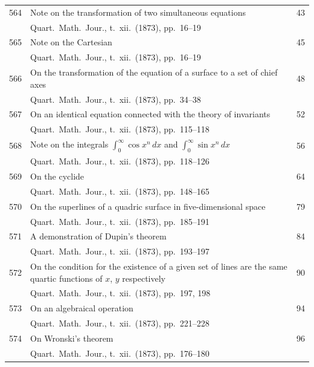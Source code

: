 \documentclass[12pt,a4paper]{article}
\theoremstyle{plain}
\theoremstyle{definition}
\begin{document}
\begin{longtable}{r @{. } p{4.8in} r}
564 & Note on the transformation of two simultaneous equations & 43 \\
  & Quart.\ Math.\ Jour., t.\ xii.\ (1873), pp.\ 16--19 & \\ 

565 & Note on the Cartesian & 45 \\
  & Quart.\ Math.\ Jour., t.\ xii.\ (1873), pp.\ 16--19 & \\ 

566 & On the transformation of the equation of a surface to a set of chief axes & 48 \\
  & Quart.\ Math.\ Jour., t.\ xii.\ (1873), pp.\ 34--38 & \\ 

567 & On an identical equation connected with the theory of invariants & 52 \\
  & Quart.\ Math.\ Jour., t.\ xii.\ (1873), pp.\ 115--118 & \\ 

568 & Note on the integrals $\displaystyle\int_0^\infty \cos x^n \,dx$ and $\displaystyle\int_0^\infty \sin x^n \,dx$ & 56 \\
  & Quart.\ Math.\ Jour., t.\ xii.\ (1873), pp.\ 118--126 & \\ 

569 & On the cyclide & 64 \\
  & Quart.\ Math.\ Jour., t.\ xii.\ (1873), pp.\ 148--165 & \\ 

570 & On the superlines of a quadric surface in five-dimensional space & 79 \\
  & Quart.\ Math.\ Jour., t.\ xii.\ (1873), pp.\ 185--191 & \\ 

571 & A demonstration of Dupin's theorem & 84 \\
  & Quart.\ Math.\ Jour., t.\ xii.\ (1873), pp.\ 193--197 & \\ 

572 & On the condition for the existence of a given set of lines are the same quartic functions of $x$, $y$ respectively & 90 \\
  & Quart.\ Math.\ Jour., t.\ xii.\ (1873), pp.\ 197, 198 & \\ 

573 & On an algebraical operation & 94 \\
  & Quart.\ Math.\ Jour., t.\ xii.\ (1873), pp.\ 221--228 & \\ 

574 & On Wronski's theorem & 96 \\
  & Quart.\ Math.\ Jour., t.\ xii.\ (1873), pp.\ 176--180 & \\ 


\end{longtable}
\end{document}
